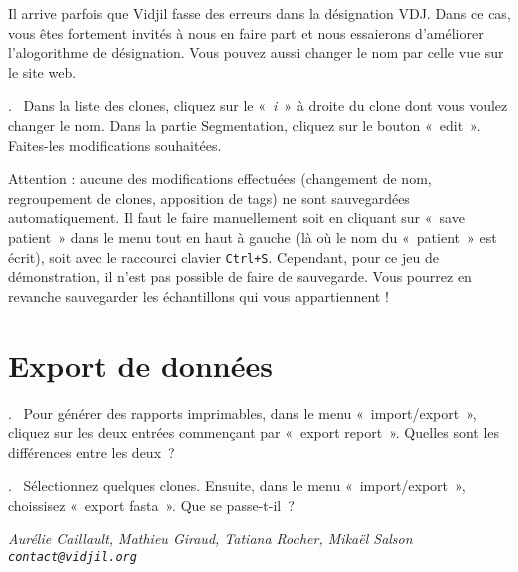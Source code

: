 \documentclass[11pt]{article}
\newcounter{questionum}
\newcommand\com[1]{\textsf{«~#1~»}}
\newcommand\question[1]{\par\noindent\textbf{\thequestionum}.~#1\addtocounter{questionum}{1}}
\begin{document}
\bigskip

Il arrive parfois que Vidjil fasse des erreurs dans la désignation VDJ.
Dans ce cas, vous êtes fortement invités à nous en faire part et nous
essaierons d'améliorer l'alogorithme de désignation. Vous pouvez aussi
changer le nom par celle vue sur le site web.

\question{%
  Dans la liste des clones, cliquez sur le «~\textit{i}~» à droite du clone dont
  vous voulez changer le nom. Dans la partie Segmentation, cliquez sur
  le bouton \com{edit}. Faites-les modifications souhaitées.}

Attention : aucune des modifications effectuées (changement de nom,
regroupement de clones, apposition de tags) ne sont sauvegardées
automatiquement.
Il faut le faire manuellement soit en cliquant sur \com{save patient} dans le
menu tout en haut à gauche (là où le nom du «~patient~» est écrit), soit avec
le raccourci clavier \texttt{Ctrl+S}.
Cependant, pour ce jeu de démonstration, il n'est pas possible de faire de
sauvegarde. Vous pourrez en revanche sauvegarder les échantillons qui vous
appartiennent !

\section{Export de données}

\question{%
  Pour générer des rapports imprimables,
  dans le menu \com{import/export}, cliquez sur les deux entrées commençant par
  \com{export report}. Quelles sont les différences entre les deux~?}
\question{
  Sélectionnez quelques clones. Ensuite, dans le menu \com{import/export},
  choissisez \com{export fasta}. Que se passe-t-il~?}

\vfill
\flushright \it Aurélie Caillault, Mathieu Giraud, Tatiana Rocher, Mikaël Salson
\\ \texttt{contact@vidjil.org}
\end{document}
